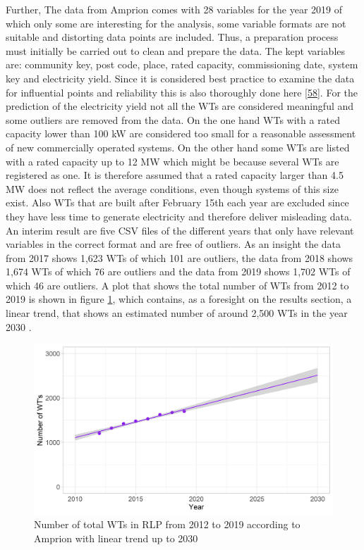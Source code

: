 \documentclass[a4paper,11pt]{article}
\begin{document}
Further, The data from Amprion comes with 28 variables for the year 2019 of which only some are interesting for the analysis, some variable formats are not suitable and distorting data points are included. Thus, a preparation process must initially be carried out to clean and prepare the data. The kept variables are: community key, post code, place, rated capacity, commissioning date, system key and electricity yield. Since it is considered best practice to examine the data for influential points and reliability this is also thoroughly done here {[}\protect\hyperlink{ref-JasonW.Osborne.2013}{58}{]}. For the prediction of the electricity yield not all the WTs are considered meaningful and some outliers are removed from the data. On the one hand WTs with a rated capacity lower than 100 kW are considered too small for a reasonable assessment of new commercially operated systems. On the other hand some WTs are listed with a rated capacity up to 12 MW which might be because several WTs are registered as one. It is therefore assumed that a rated capacity larger than 4.5 MW does not reflect the average conditions, even though systems of this size exist. Also WTs that are built after February 15th each year are excluded since they have less time to generate electricity and therefore deliver misleading data. An interim result are five CSV files of the different years that only have relevant variables in the correct format and are free of outliers. As an insight the data from 2017 shows 1,623 WTs of which 101 are outliers, the data from 2018 shows 1,674 WTs of which 76 are outliers and the data from 2019 shows 1,702 WTs of which 46 are outliers. A plot that shows the total number of WTs from 2012 to 2019 is shown in figure \ref{fig:yearswts}, which contains, as a foresight on the results section, a linear trend, that shows an estimated number of around 2,500 WTs in the year 2030 .
\begin{figure}[H]

{\centering \includegraphics[width=1\linewidth]{data/Amprion/results_of_analysis/year_wts} 

}

\caption{Number of total WTs in RLP from 2012 to 2019 according to Amprion with linear trend up to 2030}\label{fig:yearswts}
\end{figure}
\end{document}
